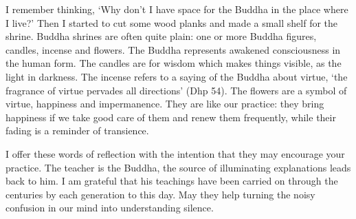 I remember thinking, `Why don't I have space for the Buddha in the place
where I live?' Then I started to cut some wood planks and made a small
shelf for the shrine. Buddha shrines are often quite plain: one or more
Buddha figures, candles, incense and flowers. The Buddha represents
awakened consciousness in the human form. The candles are for wisdom
which makes things visible, as the light in darkness. The incense refers
to a saying of the Buddha about virtue, `the fragrance of virtue
pervades all directions' (Dhp 54). The flowers are a symbol of virtue,
happiness and impermanence. They are like our practice: they bring
happiness if we take good care of them and renew them frequently, while
their fading is a reminder of transience.

I offer these words of reflection with the intention that they may
encourage your practice. The teacher is the Buddha, the source of
illuminating explanations leads back to him. I am grateful that his
teachings have been carried on through the centuries by each generation
to this day. May they help turning the noisy confusion in our mind into
understanding silence.
